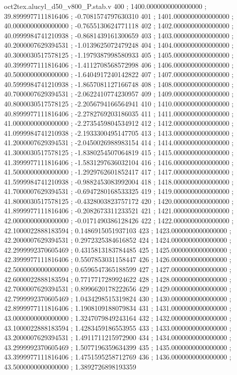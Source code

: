 \begin{filecontents}[overwrite]{oct2tex.alucyl_d50_v800_P.stab.v}
400 ; 1400.0000000000000000 ; 39.8999977111816406 ; -0.7081574797630310
401 ; 1401.0000000000000000 ; 40.0000000000000000 ; -0.7655130624771118
402 ; 1402.0000000000000000 ; 40.0999984741210938 ; -0.8681439161300659
403 ; 1403.0000000000000000 ; 40.2000007629394531 ; -1.0139625072479248
404 ; 1404.0000000000000000 ; 40.3000030517578125 ; -1.1979387998580933
405 ; 1405.0000000000000000 ; 40.3999977111816406 ; -1.4112708568572998
406 ; 1406.0000000000000000 ; 40.5000000000000000 ; -1.6404917240142822
407 ; 1407.0000000000000000 ; 40.5999984741210938 ; -1.8657081127166748
408 ; 1408.0000000000000000 ; 40.7000007629394531 ; -2.0622410774230957
409 ; 1409.0000000000000000 ; 40.8000030517578125 ; -2.2056794166564941
410 ; 1410.0000000000000000 ; 40.8999977111816406 ; -2.2782769203186035
411 ; 1411.0000000000000000 ; 41.0000000000000000 ; -2.2735459804534912
412 ; 1412.0000000000000000 ; 41.0999984741210938 ; -2.1933300495147705
413 ; 1413.0000000000000000 ; 41.2000007629394531 ; -2.0450026988983154
414 ; 1414.0000000000000000 ; 41.3000030517578125 ; -1.8380254507064819
415 ; 1415.0000000000000000 ; 41.3999977111816406 ; -1.5831297636032104
416 ; 1416.0000000000000000 ; 41.5000000000000000 ; -1.2929762601852417
417 ; 1417.0000000000000000 ; 41.5999984741210938 ; -0.9882453083992004
418 ; 1418.0000000000000000 ; 41.7000007629394531 ; -0.6947280168533325
419 ; 1419.0000000000000000 ; 41.8000030517578125 ; -0.4328003823757172
420 ; 1420.0000000000000000 ; 41.8999977111816406 ; -0.2082673311233521
421 ; 1421.0000000000000000 ; 42.0000000000000000 ; -0.0171490386128426
422 ; 1422.0000000000000000 ; 42.1000022888183594 ; 0.1486915051937103
423 ; 1423.0000000000000000 ; 42.2000007629394531 ; 0.2972325384616852
424 ; 1424.0000000000000000 ; 42.2999992370605469 ; 0.4315813183784485
425 ; 1425.0000000000000000 ; 42.3999977111816406 ; 0.5507853031158447
426 ; 1426.0000000000000000 ; 42.5000000000000000 ; 0.6596547365188599
427 ; 1427.0000000000000000 ; 42.6000022888183594 ; 0.7717717289924622
428 ; 1428.0000000000000000 ; 42.7000007629394531 ; 0.8996620178222656
429 ; 1429.0000000000000000 ; 42.7999992370605469 ; 1.0434298515319824
430 ; 1430.0000000000000000 ; 42.8999977111816406 ; 1.1908109188079834
431 ; 1431.0000000000000000 ; 43.0000000000000000 ; 1.3247079849243164
432 ; 1432.0000000000000000 ; 43.1000022888183594 ; 1.4283459186553955
433 ; 1433.0000000000000000 ; 43.2000007629394531 ; 1.4911711215972900
434 ; 1434.0000000000000000 ; 43.2999992370605469 ; 1.5077196359634399
435 ; 1435.0000000000000000 ; 43.3999977111816406 ; 1.4751595258712769
436 ; 1436.0000000000000000 ; 43.5000000000000000 ; 1.3892726898193359

\end{filecontents}
